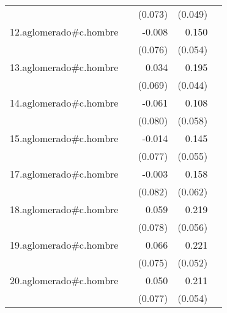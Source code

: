 {\begin{longtable}{l*{4}{D{.}{.}{-1}}}
            &                     &     (0.073)         &     (0.049)         &                     \\
\addlinespace
12.aglomerado#c.hombre&                     &      -0.008         &       0.150\sym{**} &                     \\
            &                     &     (0.076)         &     (0.054)         &                     \\
\addlinespace
13.aglomerado#c.hombre&                     &       0.034         &       0.195\sym{***}&                     \\
            &                     &     (0.069)         &     (0.044)         &                     \\
\addlinespace
14.aglomerado#c.hombre&                     &      -0.061         &       0.108         &                     \\
            &                     &     (0.080)         &     (0.058)         &                     \\
\addlinespace
15.aglomerado#c.hombre&                     &      -0.014         &       0.145\sym{**} &                     \\
            &                     &     (0.077)         &     (0.055)         &                     \\
\addlinespace
17.aglomerado#c.hombre&                     &      -0.003         &       0.158\sym{*}  &                     \\
            &                     &     (0.082)         &     (0.062)         &                     \\
\addlinespace
18.aglomerado#c.hombre&                     &       0.059         &       0.219\sym{***}&                     \\
            &                     &     (0.078)         &     (0.056)         &                     \\
\addlinespace
19.aglomerado#c.hombre&                     &       0.066         &       0.221\sym{***}&                     \\
            &                     &     (0.075)         &     (0.052)         &                     \\
\addlinespace
20.aglomerado#c.hombre&                     &       0.050         &       0.211\sym{***}&                     \\
            &                     &     (0.077)         &     (0.054)         &                     \\

\end{longtable}}

